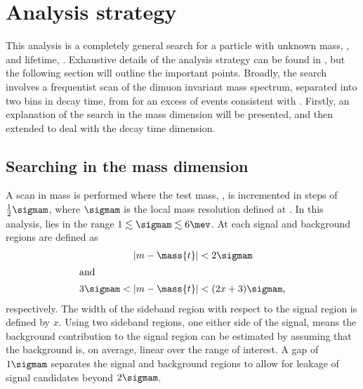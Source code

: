 \section{Analysis strategy}
\label{sec:db:strategy}

This analysis is a completely general search for a particle with unknown mass, \mass\db, and
lifetime, \lifetime\db.
Exhaustive details of the analysis strategy can be found in , but the
following section will outline the important points.
Broadly, the search involves a frequentist scan of the dimuon invariant mass spectrum,
separated into two bins in decay time, from
\btokstrmumu for an excess of events consistent with \dbtomumu.
Firstly, an explanation of the search in the mass dimension will be presented, and then extended to
deal with the decay time dimension.


\subsection{Searching in the mass dimension}
A scan in mass is performed where the test mass, , is incremented in steps of
$\tfrac12\sigmam$, where $\sigmam$ is the local mass resolution defined at .
In this analysis, \sigmam lies in the range $1\lesssim\sigmam\lesssim6\mev$.
At each  signal and background regions are defined as
\begin{align}
  |m-\mass{t}|&<2\sigmam \\
  \intertext{and}
  3\sigmam<|m-\mass{t}|&<(2x+3)\sigmam,
\end{align}
respectively.
The width of the sideband region with respect to the signal region is defined by $x$.
Using two sideband regions, one either side of the signal, means the background contribution to the
signal region can be estimated by assuming that the background is, on average, linear over the
range of interest.
A gap of $1\sigmam$ separates the signal and background regions to allow for leakage of signal
candidates beyond $2\sigmam$.

